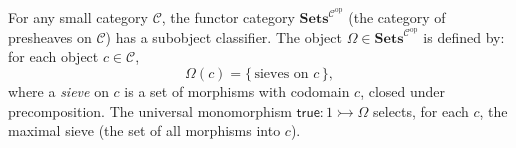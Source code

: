 For any small category $\mathcal{C}$, the functor category $\mathbf{Sets}^{\mathcal{C}^{\mathrm{op}}}$ (the category of presheaves on $\mathcal{C}$) has a subobject classifier. The object $\Omega \in \mathbf{Sets}^{\mathcal{C}^{\mathrm{op}}}$ is defined by: for each object $c \in \mathcal{C}$,
$$
\Omega(c) = \{\, \text{sieves on } c \,\},
$$
where a \textit{sieve} on $c$ is a set of morphisms with codomain $c$, closed under precomposition. The universal monomorphism $\mathsf{true} : 1 \rightarrowtail \Omega$ selects, for each $c$, the maximal sieve (the set of all morphisms into $c$).
